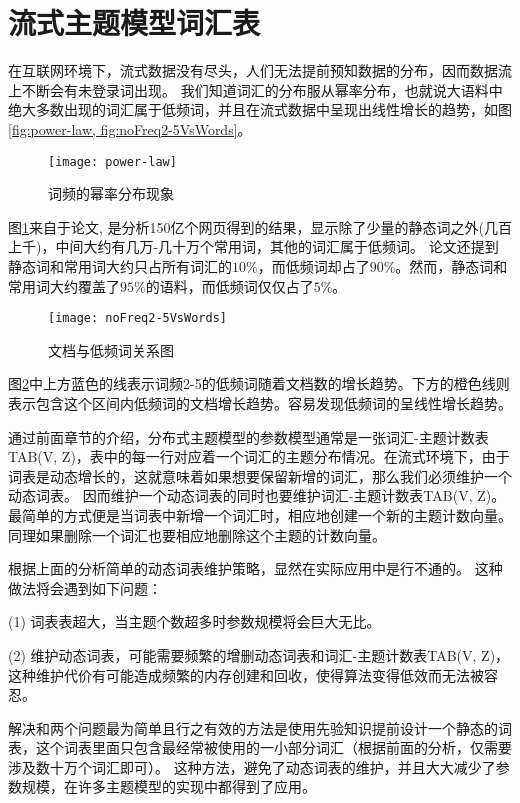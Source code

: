 \section{流式主题模型词汇表}
在互联网环境下，流式数据没有尽头，人们无法提前预知数据的分布，因而数据流上不断会有未登录词出现。
我们知道词汇的分布服从幂率分布，也就说大语料中绝大多数出现的词汇属于低频词，并且在流式数据中呈现出线性增长的趋势，如图\ref{fig:power-law, fig:noFreq2-5VsWords}。

\begin{figure}[htb]\centering
\texttt{[image: power-law]}
\caption{词频的幂率分布现象}
\label{fig:power-law}       %
\end{figure}

图\ref{fig:power-law}来自于论文\cite{yuan2015lightlda}, 是分析150亿个网页得到的结果，显示除了少量的静态词之外(几百上千)，中间大约有几万-几十万个常用词，其他的词汇属于低频词。
论文\cite{yuan2015lightlda}还提到静态词和常用词大约只占所有词汇的$10\%$，而低频词却占了$90\%$。然而，静态词和常用词大约覆盖了$95\%$的语料，而低频词仅仅占了$5\%$。

\begin{figure}[htb]\centering
\texttt{[image: noFreq2-5VsWords]}
\caption{文档与低频词关系图}
\label{fig:noFreq2-5VsWords}       %
\end{figure}

图\ref{fig:noFreq2-5VsWords}中上方蓝色的线表示词频2-5的低频词随着文档数的增长趋势。下方的橙色线则表示包含这个区间内低频词的文档增长趋势。容易发现低频词的呈线性增长趋势。

通过前面章节的介绍，分布式主题模型的参数模型通常是一张词汇-主题计数表TAB(V, Z)，表中的每一行对应着一个词汇的主题分布情况。在流式环境下，由于词表是动态增长的，这就意味着如果想要保留新增的词汇，那么我们必须维护一个动态词表。
因而维护一个动态词表的同时也要维护词汇-主题计数表TAB(V, Z)。
最简单的方式便是当词表中新增一个词汇时，相应地创建一个新的主题计数向量。
同理如果删除一个词汇也要相应地删除这个主题的计数向量。

根据上面的分析简单的动态词表维护策略，显然在实际应用中是行不通的。
这种做法将会遇到如下问题：

(1) 词表表超大，当主题个数超多时参数规模将会巨大无比。

(2) 维护动态词表，可能需要频繁的增删动态词表和词汇-主题计数表TAB(V, Z)，这种维护代价有可能造成频繁的内存创建和回收，使得算法变得低效而无法被容忍。

解决和两个问题最为简单且行之有效的方法是使用先验知识提前设计一个静态的词表，这个词表里面只包含最经常被使用的一小部分词汇（根据前面的分析，仅需要涉及数十万个词汇即可）。
这种方法，避免了动态词表的维护，并且大大减少了参数规模，在许多主题模型的实现中都得到了应用。

